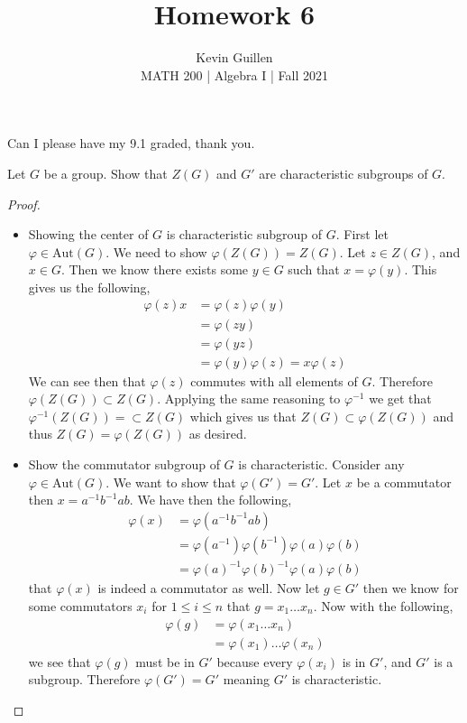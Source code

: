 \documentclass[11pt]{article}
\newenvironment{problem}[2][Problem\!]{\begin{trivlist}
\item[\hskip \labelsep {\bfseries #1}\hskip \labelsep {\bfseries #2}]}{\end{trivlist}}
\renewcommand{\phi}{\varphi}
\renewcommand{\leq}{\leqslant}
\begin{document}
 
\title{Homework 6}
\author{Kevin Guillen\\[0.5em]
MATH 200 | Algebra I | Fall 2021}
\date{} 
\maketitle

Can I please have my 9.1 graded, thank you.

\begin{tcolorbox}
    \begin{problem}{3.3}
        Let $G$ be a group. Show that $Z(G)$ and $G'$ are characteristic subgroups of $G$. 
    \end{problem}
\end{tcolorbox}
\begin{proof}
  \begin{itemize}
      \item[(a)] Showing the center of $G$ is characteristic subgroup of $G$. First let $\phi \in \text{Aut}(G)$. We need to show $\phi(Z(G)) = Z(G)$. Let $z\in Z(G)$, and $x \in G$. Then we know there exists some $y\in G$ such that $x = \phi(y)$. This gives us the following,
      \begin{align*}
          \phi(z)x &= \phi(z)\phi(y) \\
          &= \phi(zy) \\
          &= \phi(yz) \\
          &= \phi(y)\phi(z) = x\phi(z)
      \end{align*} 
      We can see then that $\phi(z)$ commutes with all elements of $G$. Therefore $\phi(Z(G)) \subset Z(G)$. Applying the same reasoning to $\phi^{-1}$ we get that $\phi^{-1}(Z(G)) = \subset Z(G)$ which gives us that $Z(G) \subset \phi(Z(G))$ and thus $Z(G) = \phi(Z(G))$ as desired.
      \item[(b)] Show the commutator subgroup of $G$ is characteristic. Consider any $\phi \in \text{Aut}(G)$. We want to show that $\phi(G') = G'$. Let $x$ be a commutator then $x = a^{-1}b^{-1}ab$. We have then the following,
      \begin{align*}
          \phi(x) &= \phi(a^{-1}b^{-1}ab) \\
          &= \phi(a^{-1})\phi(b^{-1})\phi(a)\phi(b) \\
          &= \phi(a)^{-1}\phi(b)^{-1}\phi(a)\phi(b) 
      \end{align*} 
      that $\phi(x)$ is indeed a commutator as well. 
      Now let $g \in G'$ then we know for some commutators $x_i$ for $1 \leq i \leq n$ that $g = x_1 \dots x_n$. Now with the following,
      \begin{align*}
          \phi(g) &= \phi(x_1 \dots x_n) \\
          &= \phi(x_1)\dots \phi(x_n)
      \end{align*}
      we see that $\phi(g)$ must be in $G'$ because every $\phi(x_i)$ is in $G'$, and $G'$ is a subgroup. Therefore $\phi(G') = G'$ meaning $G'$ is characteristic. 
  \end{itemize}  
\end{proof}
\end{document}
